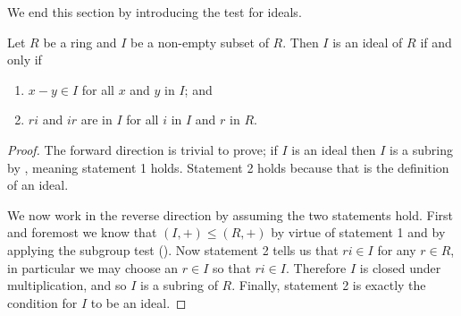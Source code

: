 \newpage

We end this section by introducing the test for ideals.
\begin{theorem}\label{thrm-test-for-ideal}
    Let $R$ be a ring and $I$ be a non-empty subset of $R$. Then $I$ is an ideal of $R$ if and only if
    \begin{enumerate}[label=(\arabic*)]
        \item $x - y \in I$ for all $x$ and $y$ in $I$; and
        \item $ri$ and $ir$ are in $I$ for all $i$ in $I$ and $r$ in $R$.
    \end{enumerate}
\end{theorem}
\begin{proof}
    The forward direction is trivial to prove; if $I$ is an ideal then $I$ is a subring by , meaning statement 1 holds. Statement 2 holds because that is the definition of an ideal.

    We now work in the reverse direction by assuming the two statements hold. First and foremost we know that $(I,+) \leq (R,+)$ by virtue of statement 1 and by applying the subgroup test (). Now statement 2 tells us that $ri \in I$ for any $r \in R$, in particular we may choose an $r \in I$ so that $ri \in I$. Therefore $I$ is closed under multiplication, and so $I$ is a subring of $R$. Finally, statement 2 is exactly the condition for $I$ to be an ideal.
\end{proof}

\newpage

